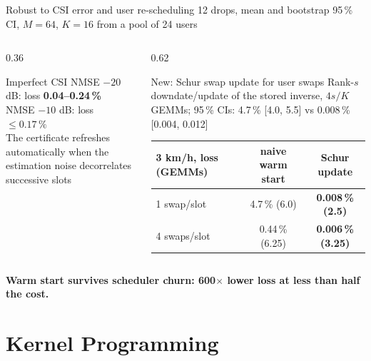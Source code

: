 \documentclass[aspectratio=169,11pt,xcolor=table]{beamer}
\newcommand{\gd}[1]{\textcolor{good}{\textbf{#1}}}
\newcommand{\best}[1]{\textbf{\textcolor{good}{#1}}}
\newcommand{\takeaway}[1]{%
  \vfill
  \begin{alertblock}{}\centering\textbf{#1}\end{alertblock}}
\begin{document}
\begin{frame}{Robust to CSI error and user re-scheduling}
  \footnotesize 12 drops, mean and bootstrap 95\,\% CI, $M=64$, $K=16$ from a pool of 24 users\\[2mm]
  \begin{columns}[T]
    \begin{column}{0.36\textwidth}
      \begin{block}{Imperfect CSI}
        \scriptsize
        NMSE $-20$ dB: loss \gd{0.04--0.24\,\%}\\
        NMSE $-10$ dB: loss \gd{$\le 0.17\,\%$}\\[1mm]
        The certificate refreshes automatically when the estimation noise decorrelates successive slots
      \end{block}
    \end{column}
    \begin{column}{0.62\textwidth}
      \begin{exampleblock}{New: Schur swap update for user swaps}
        \scriptsize
        Rank-$s$ downdate/update of the stored inverse, $4s/K$ GEMMs; 95\,\% CIs: 4.7\,\% [4.0, 5.5] vs 0.008\,\% [0.004, 0.012]\\[1mm]
        \setlength{\tabcolsep}{2.5pt}
        \begin{tabular}{lcc}
          \toprule
          3 km/h, loss (GEMMs) & naive warm start & \textbf{Schur update} \\
          \midrule
          1 swap/slot & 4.7\,\% (6.0) & \best{0.008\,\% (2.5)} \\
          4 swaps/slot & 0.44\,\% (6.25) & \best{0.006\,\% (3.25)} \\
          \bottomrule
        \end{tabular}
      \end{exampleblock}
    \end{column}
  \end{columns}
  \takeaway{Warm start survives scheduler churn: 600$\times$ lower loss at less than half the cost.}
\end{frame}

\section{Kernel Programming}
\end{document}

